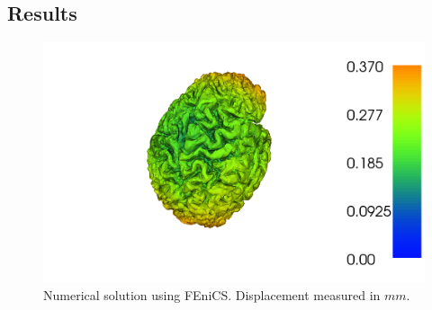 \documentclass[epsfig,11pt]{article}
\begin{document}
\subsection{Results}

 \begin{figure}[h!] 
\begin{center}
  \includegraphics[scale=0.4]{brain.png}
  \end{center}
  \caption{Numerical solution using FEniCS. Displacement measured in $mm$.}
\end{figure}



\end{document}
